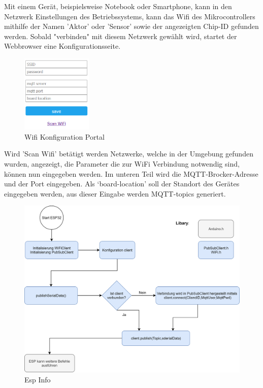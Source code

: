 Mit einem Gerät, beispielsweise Notebook oder Smartphone, kann in den Netzwerk Einstellungen des Betriebssystems, kann das Wifi des Mikrocontrollers mithilfe der Namen 'Aktor' oder 'Sensor' sowie der angezeigten Chip-ID gefunden werden. Sobald "verbinden" mit diesem Netzwerk gewählt wird, startet der Webbrowser eine Konfigurationsseite. 

\begin{figure}[H]
	\centering
	\includegraphics[width=0.3\textwidth]{graphics/Configportal2.PNG}
	\caption{Wifi Konfiguration Portal}
	\label{pic: Configportal}
\end{figure}   

Wird 'Scan Wifi' betätigt werden Netzwerke, welche in der Umgebung gefunden wurden, angezeigt, die Parameter die zur WiFi Verbindung notwendig sind, können nun eingegeben werden. Im unteren Teil wird die MQTT-Brocker-Adresse und der Port eingegeben. Als `board-location' soll der Standort des Gerätes eingegeben werden, aus dieser Eingabe werden MQTT-topics generiert. 

\begin{figure}[H]
	\centering
	\includegraphics[width=\textwidth]{graphics/MQTTSubPubClient.png}
	\caption{Esp Info}
	\label{pic: SubPubClient}
\end{figure}   

